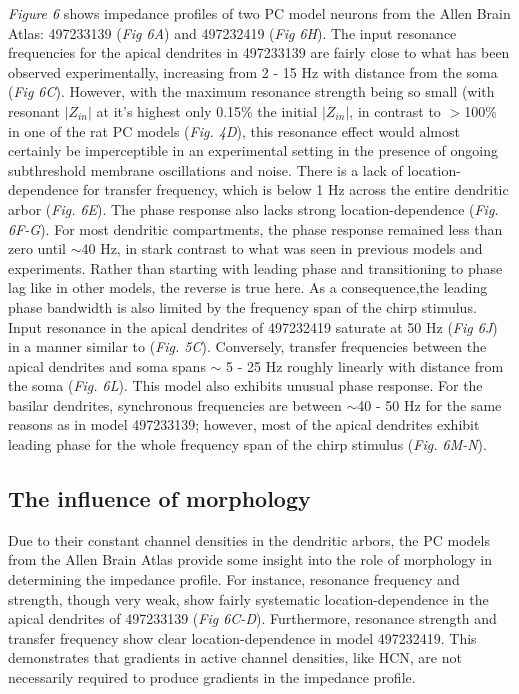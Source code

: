 \documentclass[utf8]{frontiersSCNS} %
\begin{document}
\emph{Figure 6} shows impedance profiles of two PC model neurons from the Allen Brain
Atlas: 497233139 (\emph{Fig 6A}) and 497232419 (\emph{Fig 6H}).
The input resonance frequencies for the apical dendrites in 497233139 are fairly close
to what has been observed experimentally, increasing from 2 - 15 Hz with
distance from the soma (\emph{Fig 6C}).
However, with the maximum resonance strength being so small
(with resonant $|Z_{in}|$ at it's highest only 0.15\% the initial $|Z_{in}|$, in contrast to $>$100\% in one of the rat PC models (\emph{Fig. 4D}), 
this resonance effect would almost certainly be imperceptible in an experimental setting in the presence of ongoing subthreshold membrane oscillations and noise.
There is a lack of location-dependence for transfer frequency, which is below 1 Hz across the entire dendritic arbor (\emph{Fig. 6E}).
The phase response also lacks strong location-dependence (\emph{Fig. 6F-G}). For most dendritic compartments, the phase response remained less than zero until $\sim$40 Hz, 
in stark contrast to what was seen in previous models and experiments. Rather than starting with leading phase and transitioning to phase lag like in
other models, the reverse is true here.  As a consequence,the leading phase bandwidth is also limited by the frequency span of the chirp stimulus.
Input resonance in the apical dendrites of 497232419 saturate at 50 Hz (\emph{Fig 6J}) in a manner similar to \cite{Neymotin2017-dr} (\emph{Fig. 5C}).  
Conversely, transfer frequencies between the apical dendrites and soma spans $\sim$ 5 - 25 Hz roughly linearly with distance from the soma (\emph{Fig. 6L}).
This model also exhibits unusual phase response.  For the basilar dendrites, synchronous frequencies are between $\sim$40 - 50 Hz for the same reasons as in model 497233139;
however, most of the apical dendrites exhibit leading phase for the whole frequency span of the chirp stimulus (\emph{Fig. 6M-N}).

\subsection{The influence of morphology}
Due to their constant channel densities in the dendritic arbors, the PC models from the Allen Brain Atlas provide some insight into the role of morphology 
in determining the impedance profile. 
For instance, resonance frequency and strength, though very weak, show fairly systematic location-dependence in the apical dendrites of 497233139 (\emph{Fig 6C-D}). 
Furthermore, resonance strength and transfer frequency show clear location-dependence in model 497232419.
This demonstrates that gradients in active channel densities, like HCN, are not necessarily required to produce gradients in the impedance profile.
\end{document}
